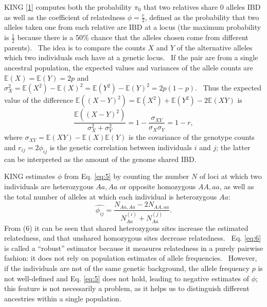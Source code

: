 \documentclass[
]{book}
\begin{document}
KING {[}\protect\hyperlink{ref-manichaikul_robust_2010}{1}{]} computes both the probability \(\pi_0\) that two relatives share 0 alleles IBD as well as the coefficient of relatedness \(\phi=\frac{r}{2}\), defined as the probability that two alleles taken one from each relative are IBD at a locus (the maximum probability is \(\frac{1}{2}\) because there is a 50\% chance that the alleles chosen come from different parents).~ The idea is to compare the counts \(X\) and \(Y\) of the alternative alleles which two individuals each have at a genetic locus.~ If the pair are from a single ancestral population, the expected values and variances of the allele counts are \(\mathbb{E}\left(X\right)=\mathbb{E}\left(Y\right)=2p\) and \(\sigma_X^2=\mathbb{E}\left(X^2\right)-\mathbb{E}\left(X\right)^2=\mathbb{E}\left(Y^2\right)-\mathbb{E}\left(Y\right)^2=2p\left(1-p\right)\).~ Thus the expected value of the difference \(\mathbb{E}\left(\left(X-Y\right)^2\right)=\mathbb{E}\left(X^2\right)+\mathbb{E}\left(Y^2\right)-2\mathbb{E}\left(XY\right)\) is\begin{equation}\frac{\mathbb{E}\left(\left(X-Y\right)^2\right)}{\sigma_X^2+\sigma_Y^2}=1-\frac{\sigma_{XY}}{\sigma_X\sigma_Y}=1-r,\label{eq:5}\end{equation}where \(\sigma_{XY}=\mathbb{E}\left(XY\right)-\mathbb{E}\left(X\right)\mathbb{E}\left(Y\right)\) is the covariance of the genotype counts and \(r_{ij}=2\phi_{ij}\) is the genetic correlation between individuals \(i\) and \(j\); the latter can be interpreted as the amount of the genome shared IBD.

KING estimates \(\phi\) from Eq. \eqref{eq:5} by counting the number \(N\) of loci at which two individuals are heterozygous \(Aa,Aa\) or opposite homozygous \(AA,aa\), as well as the total number of alleles at which each individual is heterozygous \(Aa\):\begin{equation}\hat{\phi_{ij}}=\frac{N_{Aa,Aa}-2N_{AA,aa}}{N_{Aa}^{\left(i\right)}+N_{Aa}^{\left(j\right)}}.\label{eq:6}\end{equation}From (6) it can be seen that shared heterozygous sites increase the estimated relatedness, and that unshared homozygous sites decrease relatedness.~ Eq. \eqref{eq:6} is called a ``robust'' estimator because it measures relatedness in a purely pairwise fashion: it does not rely on population estimates of allele frequencies.~ However, if the individuals are not of the same genetic background, the allele frequency \(p\) is not well-defined and Eq. \eqref{eq:5} does not hold, leading to negative estimates of \(\phi\); this feature is not necessarily a problem, as it helps us to distinguish different ancestries within a single population.
\end{document}
